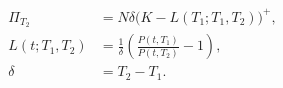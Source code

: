 \documentclass{equation-sheet}
\begin{document}
\begin{equation*}
\begin{aligned}
\Pi_{T_2}
  &= N\delta\bigl(K-L(T_1;T_1,T_2)\bigr)^{+}, \\[0.75em]
L(t;T_1,T_2)
  &= \frac{1}{\delta}
     \left(\frac{P(t,T_1)}{P(t,T_2)}-1\right), \\[0.55em]
\delta &= T_2-T_1.
\end{aligned}
\end{equation*}
\end{document}
